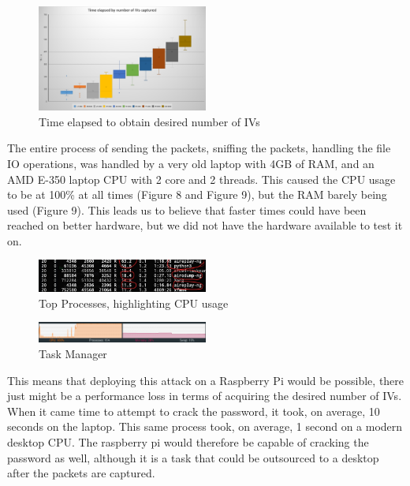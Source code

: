 \documentclass[10pt, titlepage]{article}
\begin{document}
\begin{figure}[H]
 	\centering
    \includegraphics[width=0.5\textwidth]{./images/unknown-3.png}
    \caption{Time elapsed to obtain desired number of IVs}
\end{figure}

The entire process of sending the packets, sniffing the packets, handling the file IO operations, was handled by a very old laptop with 4GB of RAM, and an AMD E-350 laptop CPU with 2 core and 2 threads. This caused the CPU usage to be at 100\% at all times (Figure 8 and Figure 9), but the RAM barely being used (Figure 9). This leads us to believe that faster times could have been reached on better hardware, but we did not have the hardware available to test it on. \\

\begin{figure}[H]
 	\centering
    \includegraphics[width=0.5\textwidth]{./images/top_procs.jpg}
    \caption{Top Processes, highlighting CPU usage}
\end{figure}

\begin{figure}[H]
 	\centering
    \includegraphics[width=0.5\textwidth]{./images/task_manager_process_view.png}
    \caption{Task Manager}
\end{figure}

This means that deploying this attack on a Raspberry Pi would be possible, there just might be a performance loss in terms of acquiring the desired number of IVs. When it came time to attempt to crack the password, it took, on average, 10 seconds on the laptop. This same process took, on average, 1 second on a modern desktop CPU. The raspberry pi would therefore be capable of cracking the password as well, although it is a task that could be outsourced to a desktop after the packets are captured.\\
\end{document}
